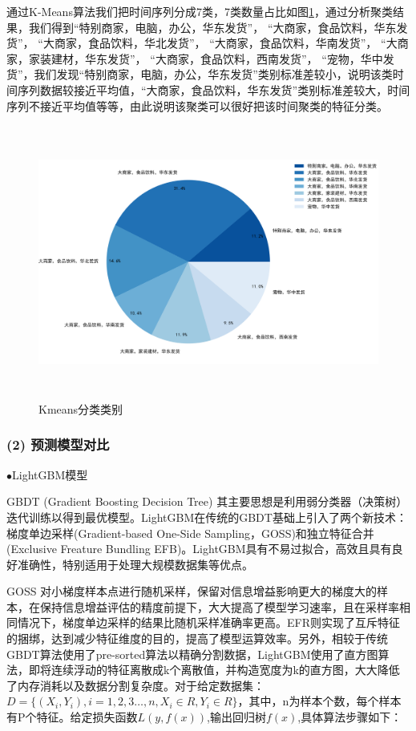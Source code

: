 \documentclass[withoutpreface,bwprint]{cumcmthesis}
\begin{document}
    通过K-Means算法我们把时间序列分成7类，7类数量占比如图\ref{Kmeans分类类别}，通过分析聚类结果，我们得到“特别商家，电脑，办公，华东发货”， “大商家，食品饮料，华东发货”， “大商家，食品饮料，华北发货”， “大商家，食品饮料，华南发货”， “大商家，家装建材，华东发货”， “大商家，食品饮料，西南发货”， “宠物，华中发货”，我们发现“特别商家，电脑，办公，华东发货”类别标准差较小，说明该类时间序列数据较接近平均值，“大商家，食品饮料，华东发货”类别标准差较大，时间序列不接近平均值等等，由此说明该聚类可以很好把该时间聚类的特征分类。
    \begin{figure}[htbp]
     \centering
     \includegraphics[width=15cm,height=9cm]{figure/Kmeans分类类别比例.png}%
     \caption{Kmeans分类类别}
     \label{Kmeans分类类别}
    \end{figure}
    \newpage

\subsubsection*{(2) 预测模型对比}
$\bullet$LightGBM模型

    GBDT (Gradient Boosting Decision Tree) 其主要思想是利用弱分类器（决策树）迭代训练以得到最优模型。LightGBM在传统的GBDT基础上引入了两个新技术：梯度单边采样(Gradient-based One-Side Sampling，GOSS)和独立特征合并(Exclusive Freature Bundling EFB)。LightGBM具有不易过拟合，高效且具有良好准确性，特别适用于处理大规模数据集等优点。
    
    GOSS 对小梯度样本点进行随机采样，保留对信息增益影响更大的梯度大的样本，在保持信息增益评估的精度前提下，大大提高了模型学习速率，且在采样率相同情况下，梯度单边采样的结果比随机采样准确率更高。EFR则实现了互斥特征的捆绑，达到减少特征维度的目的，提高了模型运算效率。另外，相较于传统GBDT算法使用了pre-sorted算法以精确分割数据，LightGBM使用了直方图算法，即将连续浮动的特征离散成k个离散值，并构造宽度为k的直方图，大大降低了内存消耗以及数据分割复杂度。对于给定数据集：$D=\lbrace(X_i,Y_i),i=1,2,3\dots,n,X_i\in R,Y_i\in R\rbrace$，其中，n为样本个数，每个样本有P个特征。给定损失函数$L(y,f(x))$,输出回归树$f(x)$,具体算法步骤如下：
\end{document}
